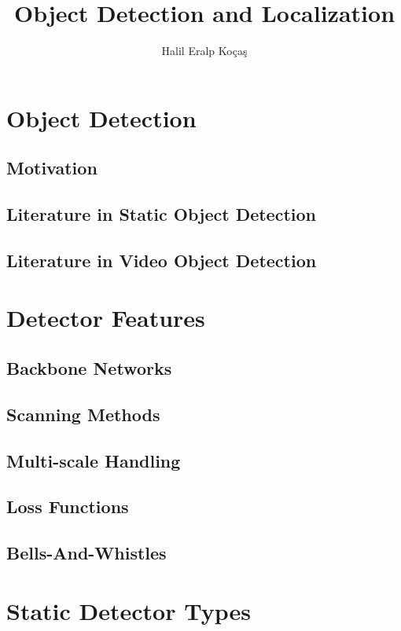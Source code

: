 \documentclass[12pt, letterpaper, twoside]{article}
\title{Object Detection and Localization}
\author{Halil Eralp Koçaş}
\begin{document}
\begin{titlepage}
\maketitle
\end{titlepage}

\section{Object Detection}

\subsection{Motivation}

\vfill
\subsection{Literature in Static Object Detection}
\subsection{Literature in Video Object Detection}

\section{Detector Features}

\subsection{Backbone Networks}
\subsection{Scanning Methods}
\subsection{Multi-scale Handling}
\subsection{Loss Functions}
\subsection{Bells-And-Whistles}

\section{Static Detector Types}
\end{document}
